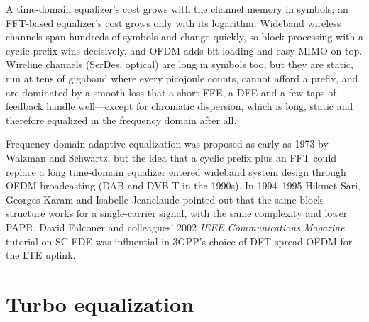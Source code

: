 
\begin{keyidea}
A time-domain equalizer's cost grows with the channel memory in symbols; an FFT-based equalizer's
cost grows only with its logarithm. Wideband wireless channels span hundreds of symbols and change
quickly, so block processing with a cyclic prefix wins decisively, and OFDM adds bit loading and easy
MIMO on top. Wireline channels (SerDes, optical) are long in symbols too, but they are static, run
at tens of gigabaud where every picojoule counts, cannot afford a prefix, and are dominated by a
smooth loss that a short FFE, a DFE and a few taps of feedback handle well---except for chromatic
dispersion, which is long, static and therefore equalized in the frequency domain after all.
\end{keyidea}

\begin{history}
Frequency-domain adaptive equalization was proposed as early as 1973 by Walzman and Schwartz, but the
idea that a cyclic prefix plus an FFT could replace a long time-domain equalizer entered wideband
system design through OFDM broadcasting (DAB and DVB-T in the 1990s). In 1994--1995 Hikmet Sari,
Georges Karam and Isabelle Jeanclaude pointed out that the same block structure works for a
single-carrier signal, with the same complexity and lower PAPR. David Falconer and colleagues'
2002 \emph{IEEE Communications Magazine} tutorial on SC-FDE was influential in 3GPP's choice of
DFT-spread OFDM for the LTE uplink.
\end{history}

\section{Turbo equalization}
\label{sec:ch12:turbo}

